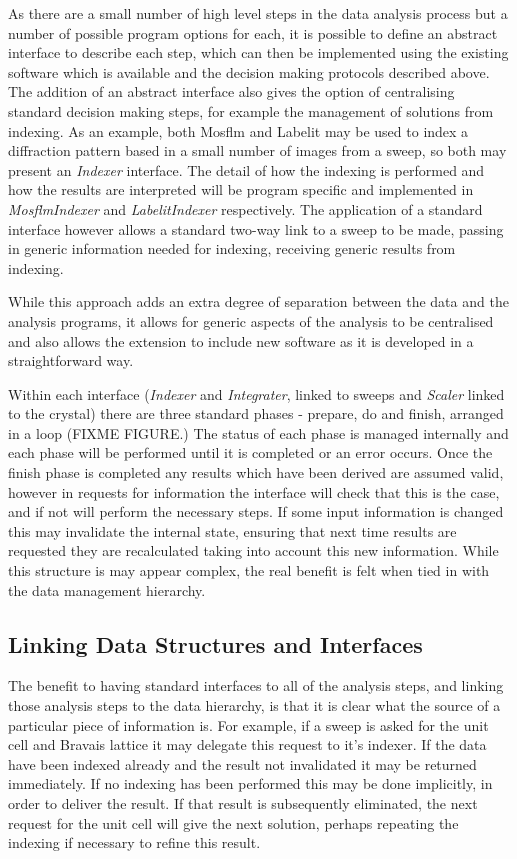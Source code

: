 \documentclass[a4paper,11pt]{article}
\begin{document}
As there are a small number of high level steps in the data analysis
process but a number of possible program options for each, it is
possible to define an abstract interface to describe each step, which
can then be implemented using the existing software which is available
and the decision making protocols described above. The addition of an
abstract interface also gives the option of centralising standard
decision making steps, for example the management of solutions from
indexing. As an example, both Mosflm and Labelit may be used to index
a diffraction pattern based in a small number of images from a sweep,
so both may present an \emph{Indexer} interface. The detail of how the
indexing is performed and how the results are interpreted will be
program specific and implemented in \emph{MosflmIndexer} and
\emph{LabelitIndexer} respectively. The application of a standard
interface however allows a standard two-way link to a sweep to be
made, passing in generic information needed for indexing, receiving
generic results from indexing.

While this approach adds an extra degree of separation between the
data and the analysis programs, it allows for generic aspects of the
analysis to be centralised and also allows the extension to include
new software as it is developed in a straightforward way. 

Within each interface (\emph{Indexer} and \emph{Integrater}, linked to
sweeps and 
\emph{Scaler} linked to the crystal) there are three standard phases -
prepare, do and 
finish, arranged in a loop (FIXME FIGURE.) The status of each phase is
managed internally and each phase will be performed until it is
completed or an error occurs. Once the finish phase is completed any
results which have been derived are assumed valid, however in requests
for information the interface will check that this is the case, and if
not will perform the necessary steps. If some input information is
changed this may invalidate the internal state, ensuring that next
time results are requested they are recalculated taking into account
this new information. While this structure is may appear complex, the
real benefit is felt when tied in with the data management hierarchy.

\subsection{Linking Data Structures and Interfaces}

The benefit to having standard interfaces to all of the analysis
steps, and linking those analysis steps to the data hierarchy, is that
it is clear what the source of a particular piece of information
is. For example, if a sweep is asked for the unit cell and Bravais
lattice it may delegate this request to it's indexer. If the data have
been indexed already and the result not invalidated it may be returned
immediately. If no indexing has been performed this may be done
implicitly, in order to deliver the result. If that result is
subsequently eliminated, the next request for the unit cell will give
the next solution, perhaps repeating the indexing if necessary to
refine this result. 
\end{document}
